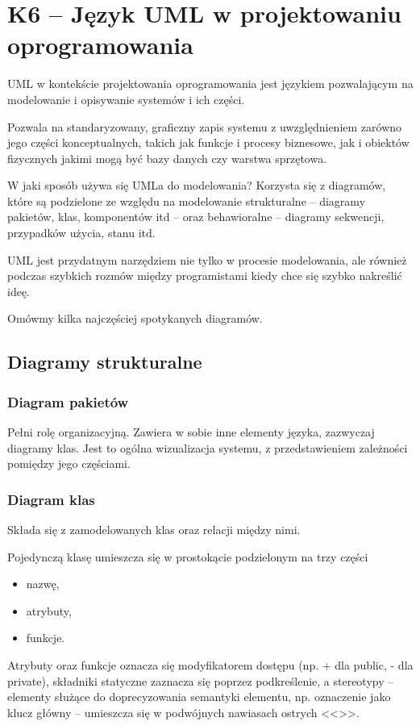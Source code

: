 \section{K6 -- Język UML w projektowaniu oprogramowania}

UML w kontekście projektowania oprogramowania jest językiem pozwalającym na modelowanie i opisywanie systemów i ich części.

Pozwala na standaryzowany, graficzny zapis systemu z uwzględnieniem zarówno jego części konceptualnych, takich jak funkcje i procesy biznesowe, jak i obiektów fizycznych jakimi mogą być bazy danych czy warstwa sprzętowa.

W jaki sposób używa się UMLa do modelowania? Korzysta się z diagramów, które są podzielone ze względu na modelowanie strukturalne -- diagramy pakietów, klas, komponentów itd -- oraz behawioralne -- diagramy sekwencji, przypadków użycia, stanu itd.

UML jest przydatnym narzędziem nie tylko w procesie modelowania, ale również podczas szybkich rozmów między programistami kiedy chce się szybko nakreślić ideę.

Omówmy kilka najczęściej spotykanych diagramów.

\subsection{Diagramy strukturalne}
\subsubsection{Diagram pakietów}
Pełni rolę organizacyjną. Zawiera w sobie inne elementy języka, zazwyczaj diagramy klas. Jest to ogólna wizualizacja systemu, z przedstawieniem zależności pomiędzy jego częściami.

\subsubsection{Diagram klas}
Składa się z zamodelowanych klas oraz relacji między nimi.

Pojedynczą klasę umieszcza się w prostokącie podzielonym na trzy części
\begin{itemize}
	\setlength\itemsep{1pt}
	\item{nazwę,}
	\item{atrybuty,}
	\item{funkcje.}
\end{itemize}

Atrybuty oraz funkcje oznacza się modyfikatorem dostępu (np. + dla public, - dla private), składniki statyczne zaznacza się poprzez podkreślenie, a stereotypy -- elementy służące do doprecyzowania semantyki elementu, np. oznaczenie jako klucz główny -- umieszcza się w podwójnych nawiasach ostrych <<>>.


